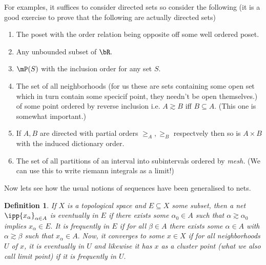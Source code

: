 \documentclass[12pt,english]{article}
\newtheorem{definition}{Definition}[section]
\begin{document}
For examples, it suffices to consider directed sets so consider the following (it is a good exercise to prove that the following are actually directed sets)
\begin{enumerate}[label=\arabic*.]
    \item The poset with the order relation being opposite off some well ordered poset. 
    \item Any unbounded subset of $\bR.$
    \item $\mP(S)$ with the inclusion order for any set $S.$
    \item The set of all neighborhoods (for us these are sets containing some open set which in turn contain some specicif point, they needn't be open themselves.) of some point ordered by reverse inclusion i.e. $A\gtrsim B$ iff $B \subseteq A.$ (This one is somewhat important.) 
    \item If $A,B$ are directed with partial orders $\geq_A,\geq_B$ respectvely then so is $A\times B$ with the induced dictionary order. 
    \item The set of all partitions of an interval into subintervals ordered by \textit{mesh.} (We can use this to write riemann integrals as a limit!)
\end{enumerate}
Now lets see how the usual notions of sequences have been generalised to nets. 
\begin{definition}
    If $X$ is a topological space and $E \subseteq X$ some subset, then a net $\ipp{x_\alpha}_{\alpha\in A}$ is \textit{eventually in} $E$ if there exists some $\alpha_0\in A$ such that $\alpha\gtrsim\alpha_0$ implies $x_\alpha\in E.$ 
    It is \textit{frequently in} $E$ if for all $\beta\in A$ there exists some $\alpha\in A$ with $\alpha\gtrsim\beta$ such that $x_\alpha\in A.$ Now, it converges to some $x\in X$ if for all neighborhoods $U$ of $x$, it is eventually in $U$ and likewise it has $x$ as a cluster point (what we also call limit point) if it is frequently in $U.$
\end{definition}
\end{document}
